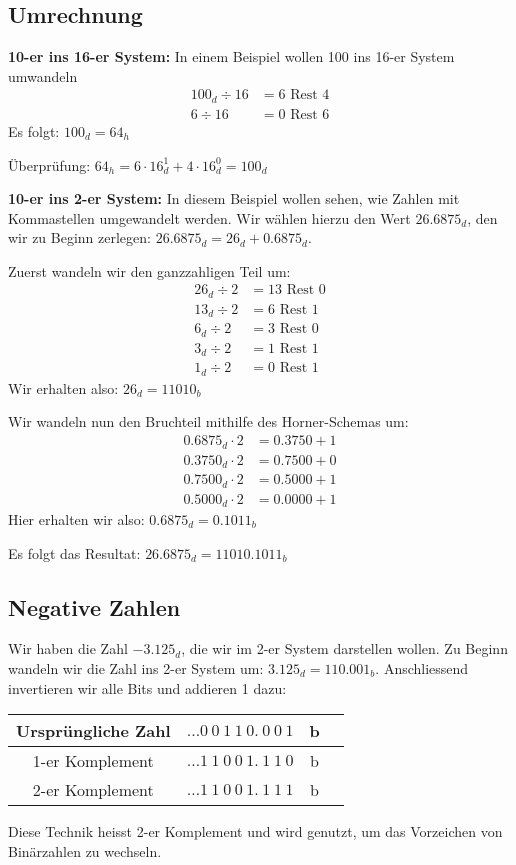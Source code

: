 \subsection{Umrechnung}\label{subsec:umrechnung}

\textbf{10-er ins 16-er System:} In einem Beispiel wollen 100 ins 16-er System umwandeln
\begin{align*}
    100_d \div 16 &= 6 \text{ Rest } 4 \\
    6 \div 16 &= 0 \text{ Rest } 6
\end{align*}
Es folgt: $100_d = 64_h$

Überprüfung: $64_h = 6 \cdot 16_d^1 + 4 \cdot 16_d^0 = 100_d$

\textbf{10-er ins 2-er System:} In diesem Beispiel wollen sehen, wie Zahlen mit Kommastellen umgewandelt werden.
Wir wählen hierzu den Wert $26.6875_d$, den wir zu Beginn zerlegen: $26.6875_d = 26_d + 0.6875_d$.

Zuerst wandeln wir den ganzzahligen Teil um:
\begin{align*}
    26_d \div 2 &= 13 \text{ Rest } 0 \\
    13_d \div 2 &= 6 \text{ Rest } 1 \\
    6_d \div 2 &= 3 \text{ Rest } 0 \\
    3_d \div 2 &= 1 \text{ Rest } 1 \\
    1_d \div 2 &= 0 \text{ Rest } 1
\end{align*}
Wir erhalten also: $26_d = 11010_b$

Wir wandeln nun den Bruchteil mithilfe des Horner-Schemas um:
\begin{align*}
    0.6875_d \cdot 2 &= 0.3750 + 1 \\
    0.3750_d \cdot 2 &= 0.7500 + 0 \\
    0.7500_d \cdot 2 &= 0.5000 + 1 \\
    0.5000_d \cdot 2 &= 0.0000 + 1
\end{align*}
Hier erhalten wir also: $0.6875_d = 0.1011_b$

Es folgt das Resultat: $26.6875_d = 11010.1011_b$

\subsection{Negative Zahlen}\label{subsec:negative-zahlen}

Wir haben die Zahl $-3.125_d$, die wir im 2-er System darstellen wollen.
Zu Beginn wandeln wir die Zahl ins 2-er System um: $3.125_d = 110.001_b$.
Anschliessend invertieren wir alle Bits und addieren 1 dazu:
\begin{center}
    \begin{tabular}{cccc}
        Ursprüngliche Zahl & $\dots 0 \ 0 \ 1 \ 1 \ 0. \ 0 \ 0 \ 1$ & b \\
        \hline
        1-er Komplement    & $\dots 1 \ 1 \ 0 \ 0 \ 1. \ 1 \ 1 \ 0$ & b \\
        \hline
        2-er Komplement    & $\dots 1 \ 1 \ 0 \ 0 \ 1. \ 1 \ 1 \ 1$ & b
    \end{tabular}
\end{center}
Diese Technik heisst 2-er Komplement und wird genutzt, um das Vorzeichen von Binärzahlen zu wechseln.

